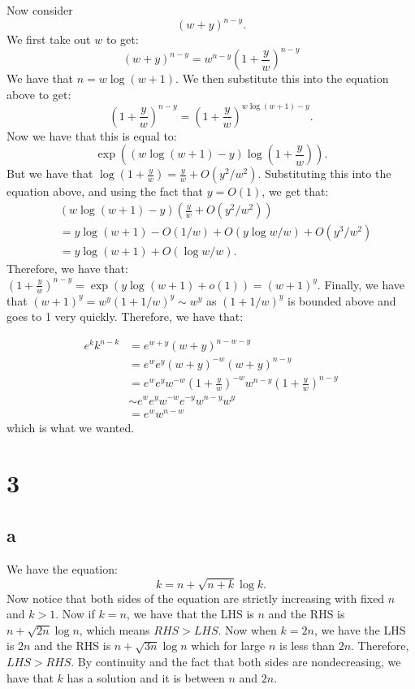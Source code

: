 \documentclass[]{article}
\begin{document}
Now consider
\begin{equation}
	(w + y)^{n - y}.
\end{equation}
We first take out $w$ to get:
\begin{equation}
	(w + y)^{n - y} = w^{n - y} \left(1 + \frac{y}{w}\right)^{n - y}
\end{equation}
We have that $n = w \log (w + 1)$. We then substitute this into the equation above to get:
\begin{equation}
	\left(1 + \frac{y}{w}\right)^{n - y} = \left(1 + \frac{y}{w}\right)^{w \log(w + 1) - y}.
\end{equation}
Now we have that this is equal to:
\begin{equation}
	\exp((w \log(w + 1) - y) \log\left(1 + \frac{y}{w}\right)).
\end{equation}
But we have that $\log\left(1 + \frac{y}{w}\right) = \frac{y}{w} + O(y^2/w^2)$. Substituting this into the equation above, and using the fact that $y = O(1)$, we get that:
\begin{align*}
	&(w \log(w + 1) - y)(\frac{y}{w} + O(y^2/w^2))\\ 
	&= y \log(w + 1) - O(1/w) + O(y \log w/w) + O(y^3/w^2)\\ 
	&=  y \log(w + 1) + O(\log w / w).
\end{align*}
Therefore, we have that:
$\left(1 + \frac{y}{w}\right)^{n - y} = \exp(y \log(w + 1) + o(1)) = (w + 1)^y$. 
Finally, we have that $(w + 1)^y = w^y (1 + 1/w)^y \sim w^y$ as $(1 + 1/w)^y$ is bounded above and goes to 1 very quickly. 
Therefore, we have that:

\begin{align*}
	e^k k^{n - k} &= e^{w + y}(w + y)^{n - w - y}\\
	&=e^w e^y (w + y)^{-w} (w + y)^{n - y}\\
	&= e^w e^y w^{-w} \left(1 + \frac{y}{w}\right)^{- w}  w^{n - y}   \left(1 + \frac{y}{w}\right)^{n - y}\\
	&\sim e^w e^y w^{-w} e^{-y}  w^{n - y} w^y\\
	&= e^w w^{n - w}
\end{align*}
which is what we wanted. 
\section{3}
\subsection{a}
We have the equation:
\begin{equation}
	k = n + \sqrt{n + k} \log k.
\end{equation}
Now notice that both sides of the equation are strictly increasing with fixed $n$ and $k > 1$. Now if $k = n$, we have that the LHS is $n$ and the RHS is $n + \sqrt{2n} \log n$, which means $RHS > LHS$. Now when $k = 2n$, we have the LHS is $2n$ and the RHS is $n + \sqrt{3n} \log n$ which for large $n$ is less than $2n$. Therefore, $LHS > RHS$. By continuity and the fact that both sides are nondecreasing, we have that $k$ has a solution and it is between $n$ and $2n$. 
\end{document}
